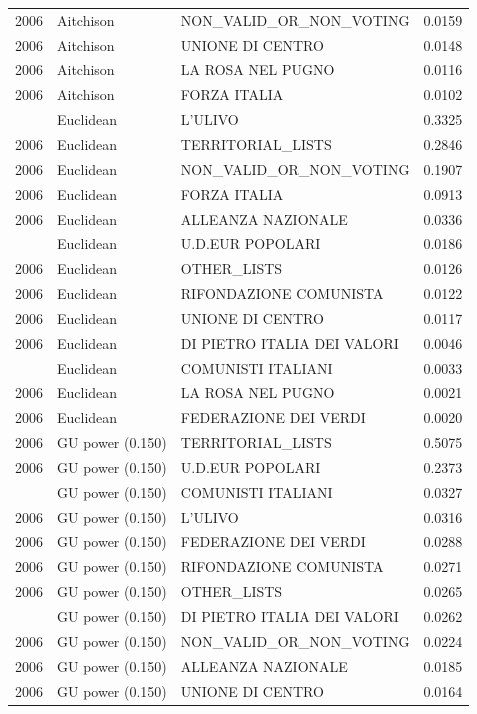 \begin{longtable}[t]{rllr}
2006 & Aitchison & NON\_VALID\_OR\_NON\_VOTING & 0.0159\\
2006 & Aitchison & UNIONE DI CENTRO & 0.0148\\
2006 & Aitchison & LA ROSA NEL PUGNO & 0.0116\\
2006 & Aitchison & FORZA ITALIA & 0.0102\\
\addlinespace
2006 & Euclidean & L'ULIVO & 0.3325\\
2006 & Euclidean & TERRITORIAL\_LISTS & 0.2846\\
2006 & Euclidean & NON\_VALID\_OR\_NON\_VOTING & 0.1907\\
2006 & Euclidean & FORZA ITALIA & 0.0913\\
2006 & Euclidean & ALLEANZA NAZIONALE & 0.0336\\
\addlinespace
2006 & Euclidean & U.D.EUR POPOLARI & 0.0186\\
2006 & Euclidean & OTHER\_LISTS & 0.0126\\
2006 & Euclidean & RIFONDAZIONE COMUNISTA & 0.0122\\
2006 & Euclidean & UNIONE DI CENTRO & 0.0117\\
2006 & Euclidean & DI PIETRO ITALIA DEI VALORI & 0.0046\\
\addlinespace
2006 & Euclidean & COMUNISTI ITALIANI & 0.0033\\
2006 & Euclidean & LA ROSA NEL PUGNO & 0.0021\\
2006 & Euclidean & FEDERAZIONE DEI VERDI & 0.0020\\
2006 & GU power (0.150) & TERRITORIAL\_LISTS & 0.5075\\
2006 & GU power (0.150) & U.D.EUR POPOLARI & 0.2373\\
\addlinespace
2006 & GU power (0.150) & COMUNISTI ITALIANI & 0.0327\\
2006 & GU power (0.150) & L'ULIVO & 0.0316\\
2006 & GU power (0.150) & FEDERAZIONE DEI VERDI & 0.0288\\
2006 & GU power (0.150) & RIFONDAZIONE COMUNISTA & 0.0271\\
2006 & GU power (0.150) & OTHER\_LISTS & 0.0265\\
\addlinespace
2006 & GU power (0.150) & DI PIETRO ITALIA DEI VALORI & 0.0262\\
2006 & GU power (0.150) & NON\_VALID\_OR\_NON\_VOTING & 0.0224\\
2006 & GU power (0.150) & ALLEANZA NAZIONALE & 0.0185\\
2006 & GU power (0.150) & UNIONE DI CENTRO & 0.0164\\

\end{longtable}
